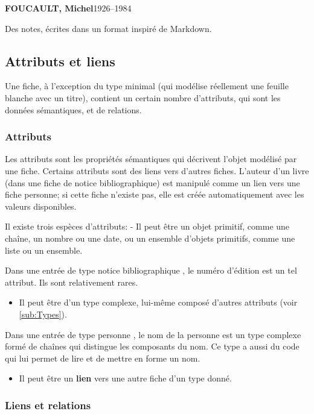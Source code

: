 \documentclass[11pt]{article}
\newcommand\tzcard[1]{%
    \begin{minipage}[t]{1\columnwidth}%
    \begin{shaded}%
    \sffamily #1
    \end{shaded}%
    \end{minipage}
}
\begin{document}
\tzcard{\textbf{FOUCAULT, Michel}\hfill1926--1984}

Des notes, écrites dans un format inspiré de Markdown.

\subsection{Attributs et liens}\label{attributs-et-liens}

Une fiche, à l'exception du type minimal (qui modélise réellement une
feuille blanche avec un titre), contient un certain nombre d'attributs,
qui sont les données sémantiques, et de relations.

\subsubsection{Attributs}\label{par:attributs}

Les attributs sont les propriétés sémantiques qui décrivent l'objet
modélisé par une fiche. Certains attributs sont des liens vers d'autres
fiches. L'auteur d'un livre (dans une fiche de notice bibliographique)
est manipulé comme un lien vers une fiche personne; si cette fiche
n'existe pas, elle est créée automatiquement avec les valeurs
disponibles.

Il existe trois espèces d'attributs: - Il peut être un objet primitif,
comme une chaîne, un nombre ou une date, ou un ensemble d'objets
primitifs, comme une liste ou un ensemble.

Dans une entrée de type \og notice bibliographique \fg{}, le numéro
d'édition est un tel attribut. Ils sont relativement rares.

\begin{itemize}
\itemsep1pt\parskip0pt
\item
  Il peut être d'un type complexe, lui-même composé d'autres attributs
  (voir \vref{sub:Types}).
\end{itemize}

Dans une entrée de type \og personne \fg{}, le nom de la personne est un
type complexe formé de chaînes qui distingue les composants du nom. Ce
type a aussi du code qui lui permet de lire et de mettre en forme un
nom.

\begin{itemize}
\itemsep1pt\parskip0pt
\item
  Il peut être un \textbf{lien} vers une autre fiche d'un type donné.
\end{itemize}

\subsubsection{Liens et relations}\label{liens-et-relations}
\end{document}

